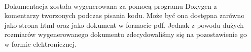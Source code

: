 \paragraph{}

Dokumentacja została wygenerowana za pomocą programu Doxygen z komentarzy tworzonych podczas pisania kodu. Może być ona dostępna zarówno jako strona html oraz jako dokument w formacie pdf. Jednak z powodu dużych rozmiarów wygenerowanego dokumentu zdecydowaliśmy się na pozostawienie go w formie elektronicznej.

